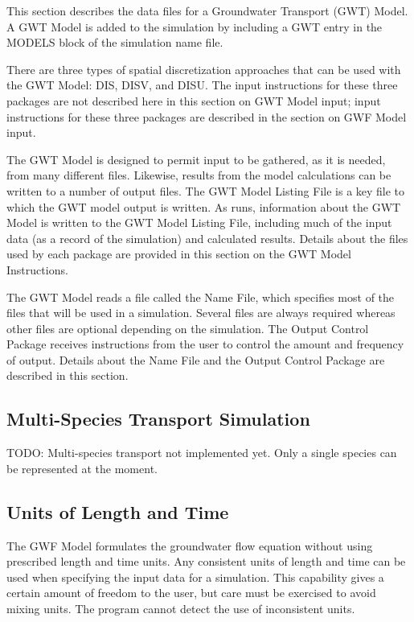 This section describes the data files for a \mf Groundwater Transport (GWT) Model.  A GWT Model is added to the simulation by including a GWT entry in the MODELS block of the simulation name file.

There are three types of spatial discretization approaches that can be used with the GWT Model: DIS, DISV, and DISU.  The input instructions for these three packages are not described here in this section on GWT Model input; input instructions for these three packages are described in the section on GWF Model input.

The GWT Model is designed to permit input to be gathered, as it is needed, from many different files.  Likewise, results from the model calculations can be written to a number of output files. The GWT Model Listing File is a key file to which the GWT model output is written.  As \mf runs, information about the GWT Model is written to the GWT Model Listing File, including much of the input data (as a record of the simulation) and calculated results.  Details about the files used by each package are provided in this section on the GWT Model Instructions.

The GWT Model reads a file called the Name File, which specifies most of the files that will be used in a simulation. Several files are always required whereas other files are optional depending on the simulation. The Output Control Package receives instructions from the user to control the amount and frequency of output.  Details about the Name File and the Output Control Package are described in this section.

\subsection{Multi-Species Transport Simulation}
TODO: Multi-species transport not implemented yet.  Only a single species can be represented at the moment.

\subsection{Units of Length and Time}
The GWF Model formulates the groundwater flow equation without using prescribed length and time units. Any consistent units of length and time can be used when specifying the input data for a simulation. This capability gives a certain amount of freedom to the user, but care must be exercised to avoid mixing units.  The program cannot detect the use of inconsistent units.

